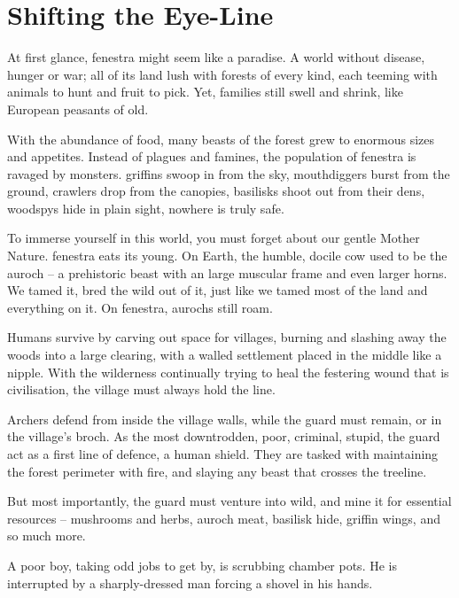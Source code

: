 \section{Shifting the Eye-Line}

\begin{multicols}{2}

\noindent
At first glance, \gls{fenestra} might seem like a paradise.
A world without disease, hunger or war; all of its land lush with forests of every kind, each teeming with animals to hunt and fruit to pick.
Yet, families still swell and shrink, like European peasants of old.

With the abundance of food, many beasts of the forest grew to enormous sizes and appetites.
Instead of plagues and famines, the population of \gls{fenestra} is ravaged by \glspl{monster}.
\Glspl{griffin} swoop in from the sky, mouthdiggers burst from the ground, \glspl{crawler} drop from the canopies, \glspl{basilisk} shoot out from their dens, \glspl{woodspy} hide in plain sight, nowhere is truly safe.

To immerse yourself in this world, you must forget about our gentle Mother Nature.
\Gls{fenestra} eats its young.
On Earth, the humble, docile cow used to be the auroch -- a prehistoric beast with an large muscular frame and even larger horns.
We tamed it, bred the wild out of it, just like we tamed most of the land and everything on it.
On \gls{fenestra}, aurochs still roam.

Humans survive by carving out space for \glspl{village}, burning and slashing away the woods into a large clearing, with a walled settlement placed in the middle like a nipple.
With the wilderness continually trying to heal the festering wound that is civilisation, the \gls{village} must always hold the line.

Archers defend from inside the \gls{village} walls, while the \gls{guard} must remain, or in the \gls{village}'s \gls{broch}.
As the most downtrodden, poor, criminal, stupid, the \gls{guard} act as a first line of defence, a human shield.
They are tasked with maintaining the forest perimeter with fire, and slaying any beast that crosses the treeline.

But most importantly, the \gls{guard} must venture into wild, and mine it for essential resources -- mushrooms and herbs, auroch meat, \gls{basilisk} hide, \gls{griffin} wings, and so much more.

\begin{exampletext}
  A poor boy, taking odd jobs to get by, is scrubbing chamber pots.
  He is interrupted by a sharply-dressed man forcing a shovel in his hands.


\end{exampletext}
\end{multicols}
